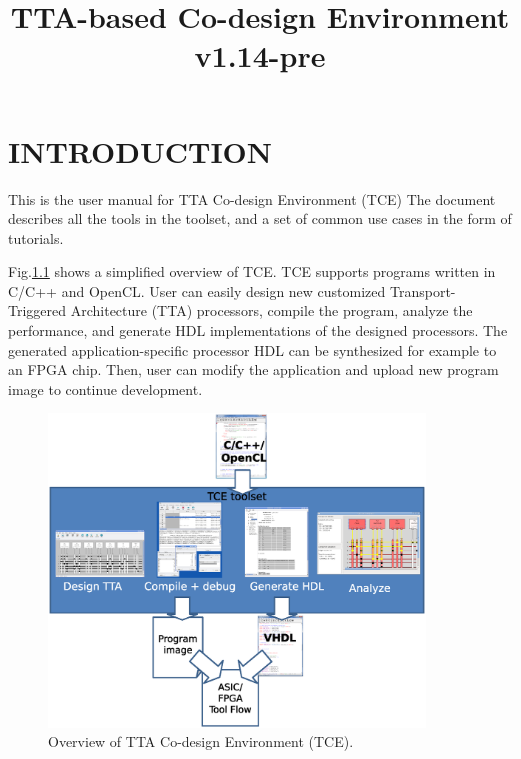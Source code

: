 \documentclass[twoside]{tceusermanual}
\begin{document}
\title{TTA-based Co-design Environment v1.14-pre}
\maketitle

\tableofcontents

\chapter{INTRODUCTION}

This is the user manual for TTA Co-design Environment (TCE)
\cite{tcewww}
\cite{lptce1}
The document describes all the tools in the toolset, and a set of common use 
cases in the form of tutorials.

Fig.\ref{fig:tce_overview} shows a simplified overview of TCE. TCE supports
programs written in C/C++ and OpenCL. User can easily design new customized
Transport-Triggered Architecture (TTA) processors, compile the program,
analyze the performance, and generate HDL implementations of the designed
processors. The generated application-specific processor HDL can be 
synthesized for example to an FPGA chip. Then, user can modify the 
application and upload new program image to continue development.

\begin{figure}
  \begin{center}
    \includegraphics[width=10cm]{eps/tce_overview}
    \caption{Overview of TTA Co-design Environment (TCE).}
    \label{fig:tce_overview}
  \end{center}
\end{figure}
\end{document}
